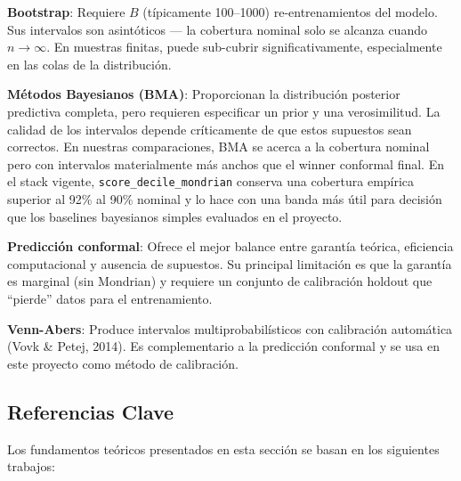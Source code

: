 \documentclass[
  spanish,
  11pt,
  letterpaper,
]{scrbook}
\theoremstyle{plain}
\theoremstyle{remark}
\begin{document}
\textbf{Bootstrap}: Requiere \(B\) (típicamente 100--1000)
re-entrenamientos del modelo. Sus intervalos son asintóticos --- la
cobertura nominal solo se alcanza cuando \(n \to \infty\). En muestras
finitas, puede sub-cubrir significativamente, especialmente en las colas
de la distribución.

\textbf{Métodos Bayesianos (BMA)}: Proporcionan la distribución
posterior predictiva completa, pero requieren especificar un prior y una
verosimilitud. La calidad de los intervalos depende críticamente de que
estos supuestos sean correctos. En nuestras comparaciones, BMA se acerca
a la cobertura nominal pero con intervalos materialmente más anchos que
el winner conformal final. En el stack vigente,
\texttt{score\_decile\_mondrian} conserva una cobertura empírica
superior al 92\% al 90\% nominal y lo hace con una banda más útil para
decisión que los baselines bayesianos simples evaluados en el proyecto.

\textbf{Predicción conformal}: Ofrece el mejor balance entre garantía
teórica, eficiencia computacional y ausencia de supuestos. Su principal
limitación es que la garantía es marginal (sin Mondrian) y requiere un
conjunto de calibración holdout que ``pierde'' datos para el
entrenamiento.

\textbf{Venn-Abers}: Produce intervalos multiprobabilísticos con
calibración automática (Vovk \& Petej, 2014). Es complementario a la
predicción conformal y se usa en este proyecto como método de
calibración.

\subsection{Referencias Clave}\label{sec-uq-references}

Los fundamentos teóricos presentados en esta sección se basan en los
siguientes trabajos:
\end{document}

